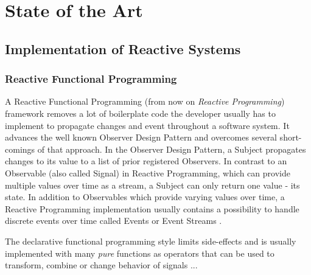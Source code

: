 \chapter{State of the Art} \label{chap:State of the Art}

\section{Implementation of Reactive Systems}
	\subsection{Reactive Functional Programming}
	A Reactive Functional Programming (from now on \emph{Reactive Programming}) framework removes a lot of boilerplate code the developer usually has to implement to propagate changes and event throughout a software system.	It advances the well known Observer Design Pattern and overcomes several short-comings of that approach. In the Observer Design Pattern, a Subject propagates changes to its value to a list of prior registered Observers. In contrast to an Observable (also called Signal) in Reactive Programming, which can provide multiple values over time as a stream, a Subject can only return one value - its state.
	In addition to Observables which provide varying values over time, a Reactive Programming implementation usually contains a possibility to handle discrete events over time called Events or Event Streams \cite{BaconJs}.
	
	
	The declarative functional programming style limits side-effects and is usually implemented with many \emph{pure} functions as operators that can be used to transform, combine or change behavior of signals ...
	 
